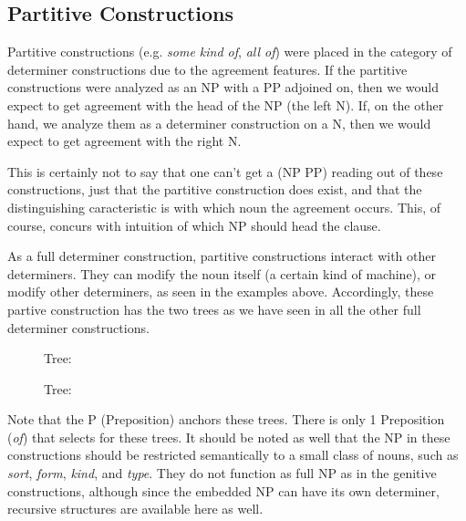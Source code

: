 


\subsection{Partitive Constructions}

Partitive constructions (e.g. {\it  some kind of}, {\it all of\/}) were placed in the category
of determiner constructions due to the agreement features.  If the partitive
constructions were analyzed as an NP with a PP adjoined on, then we would
expect to get agreement with the head of the NP (the left N).  If, on the other hand, we
analyze them as a determiner construction on a N, then we would expect to get
agreement with the right N.


This is certainly not to say that one can't get a (NP PP) reading out of these
constructions, just that the partitive construction does exist, and that the
distinguishing caracteristic is with which noun the agreement occurs.  This,
of course, concurs with intuition of which NP should head the clause.


As a full determiner construction, partitive constructions interact with other
determiners.  They can modify the noun itself (a certain kind of machine), or
modify other determiners, as seen in the examples above.  Accordingly, these
partive construction has the two trees as we have seen in all the other full
determiner constructions.


\begin{figure}[ht]
\centering
{}
\caption{ Tree: }
\end{figure}

\begin{figure}[ht]
\centering
{}
\caption{ Tree:  }
\end{figure}

Note that the P (Preposition) anchors these trees.  There is only 1 Preposition
({\it of}) that selects for these trees.  It should be noted as well that the NP in
these constructions should be restricted semantically to a small class of
nouns, such as {\it sort}, {\it form}, {\it kind}, and {\it type}.  They do not function as
full NP as in the genitive constructions, although since the embedded NP can
have its own determiner, recursive structures are available here as well.


